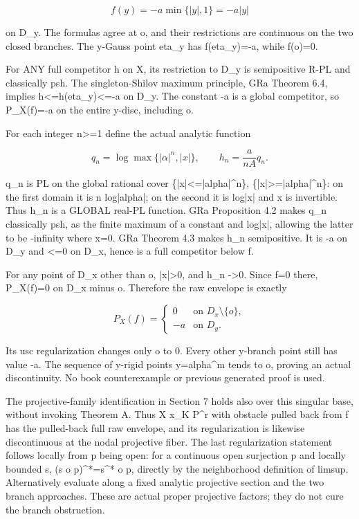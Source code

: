 \documentclass[11pt]{article}
\begin{document}
\[
f(y)=-a\min\{|y|,1\}=-a|y|
\]

on D\_y. The formulas agree at o, and their restrictions are continuous on the two closed branches. The y-Gauss point eta\_y has f(eta\_y)=-a, while f(o)=0.

For ANY full competitor h on X, its restriction to D\_y is semipositive R-PL and classically psh. The singleton-Shilov maximum principle, GRa Theorem 6.4, implies h<=h(eta\_y)<=-a on D\_y. The constant -a is a global competitor, so P\_X(f)=-a on the entire y-disc, including o.

For each integer n>=1 define the actual analytic function

\[
q_n=\log\max\{|\alpha|^n,|x|\},\qquad h_n=\frac{a}{nA}q_n.
\]

q\_n is PL on the global rational cover \{|x|<=|alpha|\textasciicircum{}n\}, \{|x|>=|alpha|\textasciicircum{}n\}: on the first domain it is n log|alpha|; on the second it is log|x| and x is invertible. Thus h\_n is a GLOBAL real-PL function. GRa Proposition 4.2 makes q\_n classically psh, as the finite maximum of a constant and log|x|, allowing the latter to be -infinity where x=0. GRa Theorem 4.3 makes h\_n semipositive. It is -a on D\_y and <=0 on D\_x, hence is a full competitor below f.

For any point of D\_x other than o, |x|>0, and h\_n ->0. Since f=0 there, P\_X(f)=0 on D\_x minus o. Therefore the raw envelope is exactly

\[
P_X(f)=\begin{cases}0&\text{on }D_x\setminus\{o\},\\-a&\text{on }D_y.\end{cases}
\]

Its usc regularization changes only o to 0. Every other y-branch point still has value -a. The sequence of y-rigid points y=alpha\textasciicircum{}m tends to o, proving an actual discontinuity. No book counterexample or previous generated proof is used.

The projective-family identification in Section 7 holds also over this singular base, without invoking Theorem A. Thus X x\_K P\textasciicircum{}r with obstacle pulled back from f has the pulled-back full raw envelope, and its regularization is likewise discontinuous at the nodal projective fiber. The last regularization statement follows locally from p being open: for a continuous open surjection p and locally bounded s, (s o p)\textasciicircum{}*=s\textasciicircum{}* o p, directly by the neighborhood definition of limsup. Alternatively evaluate along a fixed analytic projective section and the two branch approaches. These are actual proper projective factors; they do not cure the branch obstruction.
\end{document}
